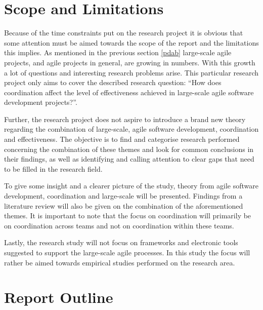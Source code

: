 \section{Scope and Limitations}



Because of the time constraints put on the research project it is obvious that some attention must be aimed towards the scope of the report and the limitations this implies. As mentioned in the previous section \ref{pdab} large-scale agile projects, and agile projects in general, are growing in numbers. With this growth a lot of questions and interesting research problems arise. This particular research project only aims to cover the described research question: ``How does coordination affect the level of effectiveness achieved in large-scale agile software development projects?''.

Further, the research project does not aspire to introduce a brand new theory regarding the combination of large-scale, agile software development, coordination and effectiveness. The objective is to find and categorise research performed concerning the combination of these themes and look for common conclusions in their findings, as well as identifying and calling attention to clear gaps that need to be filled in the research field.

To give some insight and a clearer picture of the study, theory from agile software development, coordination and large-scale will be presented. Findings from a literature review will also be given on the combination of the aforementioned themes. It is important to note that the focus on coordination will primarily be on coordination across teams and not on coordination within these teams.

Lastly, the research study will not focus on frameworks and electronic tools suggested to support the large-scale agile processes. In this study the focus will rather be aimed towards empirical studies performed on the research area.

\section{Report Outline}